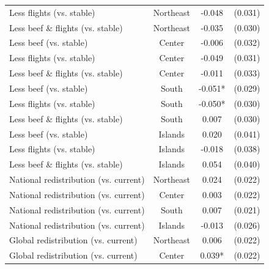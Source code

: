 \begin{table}[H]
\begin{tabular}{ l c c c }
\hspace{0.05cm} Less flights (vs. stable) & Northeast & -0.048 & (0.031) \\
\hspace{0.05cm} Less beef \& flights (vs. stable) & Northeast & -0.035 & (0.030) \\
\hspace{0.05cm} Less beef (vs. stable) & Center & -0.006 & (0.032) \\
\hspace{0.05cm} Less flights (vs. stable) & Center & -0.049 & (0.031) \\
\hspace{0.05cm} Less beef \& flights (vs. stable) & Center & -0.011 & (0.033) \\
\hspace{0.05cm} Less beef (vs. stable) & South & -0.051* & (0.029) \\
\hspace{0.05cm} Less flights (vs. stable) & South & -0.050* & (0.030) \\
\hspace{0.05cm} Less beef \& flights (vs. stable) & South & 0.007 & (0.030) \\
\hspace{0.05cm} Less beef (vs. stable) & Islands & 0.020 & (0.041) \\
\hspace{0.05cm} Less flights (vs. stable) & Islands & -0.018 & (0.038) \\
\hspace{0.05cm} Less beef \& flights (vs. stable) & Islands & 0.054 & (0.040) \\
\hspace{0.05cm} National redistribution (vs. current) & Northeast & 0.024 & (0.022) \\
\hspace{0.05cm} National redistribution (vs. current) & Center & 0.003 & (0.022) \\
\hspace{0.05cm} National redistribution (vs. current) & South & 0.007 & (0.021) \\
\hspace{0.05cm} National redistribution (vs. current) & Islands & -0.013 & (0.026) \\
\hspace{0.05cm} Global redistribution (vs. current) & Northeast & 0.006 & (0.022) \\
\hspace{0.05cm} Global redistribution (vs. current) & Center & 0.039* & (0.022) \\

\end{tabular}
\end{table}
